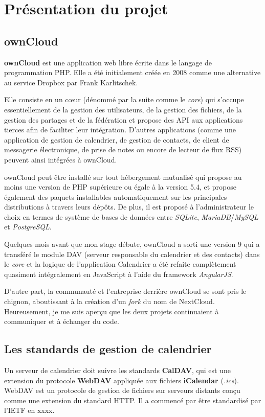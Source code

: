 \documentclass[10pt,a4paper]{report}
\begin{document}
	\section{Présentation du projet}
	
	\subsection{ownCloud}
	\textbf{ownCloud} est une application web libre écrite dans le langage de programmation PHP. Elle a été initialement créée en 2008 comme une alternative au service Dropbox par Frank Karlitschek.
	
	Elle consiste en un cœur (dénommé par la suite comme le \textit{core}) qui s'occupe essentiellement de la gestion des utilisateurs, de la gestion des fichiers, de la gestion des partages et de la fédération et propose des API aux applications tierces afin de faciliter leur intégration. D'autres applications (comme une application de gestion de calendrier, de gestion de contacts, de client de messagerie électronique, de prise de notes ou encore de lecteur de flux RSS) peuvent ainsi intégrées à ownCloud.
	
	ownCloud peut être installé sur tout hébergement mutualisé qui propose au moins une version de PHP supérieure ou égale à la version 5.4, et propose également des paquets installables automatiquement sur les principales distributions à travers leurs dépôts. De plus, il est proposé à l'administrateur le choix en termes de système de bases de données entre \textit{SQLite}, \textit{MariaDB}/\textit{MySQL} et \textit{PostgreSQL}.
	
	Quelques mois avant que mon stage débute, ownCloud a sorti une version 9 qui a transféré le module DAV (serveur responsable du calendrier et des contacts) dans le \textit{core} et la logique de l'application Calendrier a été refaite complètement quasiment intégralement en JavaScript à l'aide du framework \textit{AngularJS}.
	
	D'autre part, la communauté et l'entreprise derrière ownCloud se sont pris le chignon, aboutissant à la création d'un \textit{fork} du nom de NextCloud. Heureusement, je me suis aperçu que les deux projets continuaient à communiquer et à échanger du code.
	
	\subsection{Les standards de gestion de calendrier}
	Un serveur de calendrier doit suivre les standards \textbf{CalDAV}, qui est une extension du protocole \textbf{WebDAV} appliquée aux fichiers \textbf{iCalendar} (\textit{.ics}). WebDAV est un protocole de gestion de fichiers sur serveurs distants conçu comme une extension du standard HTTP. Il a commencé par être standardisé par l'IETF en xxxx.
	
\end{document}
